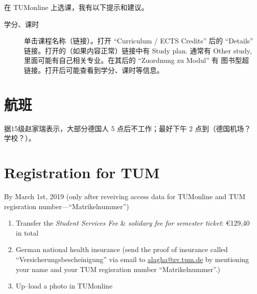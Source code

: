 \documentclass{article}
\begin{document}
在 TUMonline 上选课，我有以下提示和建议。
\begin{description}
\item[学分、课时] 单击课程名称（链接）。打开 ``Curriculum /
ECTS Credits'' 后的 ``Details'' 链接。打开的（如果内容正常）链接中有 Study plan. 通常有 Other study, 里面可能有自己相关专业。在其后的 ``Zuordnung zu Modul'' 有
图书型超链接。打开后可能查看到学分、课时等信息。
\end{description}

\section{航班}
据15级赵家瑞表示，大部分德国人 5 点后不工作；最好下午 2 点到（德国机场？学校？）。

\section{Registration for TUM}
By March 1st, 2019 (only after reveiving access data for TUMonline and TUM regisration number---``Matrikelnummer'')
\begin{enumerate}
\item Transfer the \emph{Student Services Fee} \& \emph{solidary fee for semester ticket}: \euro{129,40} in total
\item German national health insurance (send the proof of insurance called ``Versicherungsbescheinigung'' via email to \href{mailto:alagha@zv.tum.de}{alagha@zv.tum.de} by mentioning your name and your TUM regisration number ``Matrikelnummer''.)
\item Up--load a photo in TUMonline
\end{enumerate}
\end{document}
